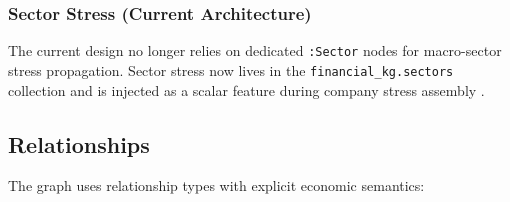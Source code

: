 \subsubsection{Sector Stress (Current Architecture)}

The current design no longer relies on dedicated \texttt{:Sector} nodes for macro-sector stress propagation. Sector stress now lives in the \texttt{financial\_kg.sectors} collection and is injected as a scalar feature during company stress assembly \cite{ref12} \cite{ref22}.

\subsection{Relationships}

The graph uses relationship types with explicit economic semantics:

